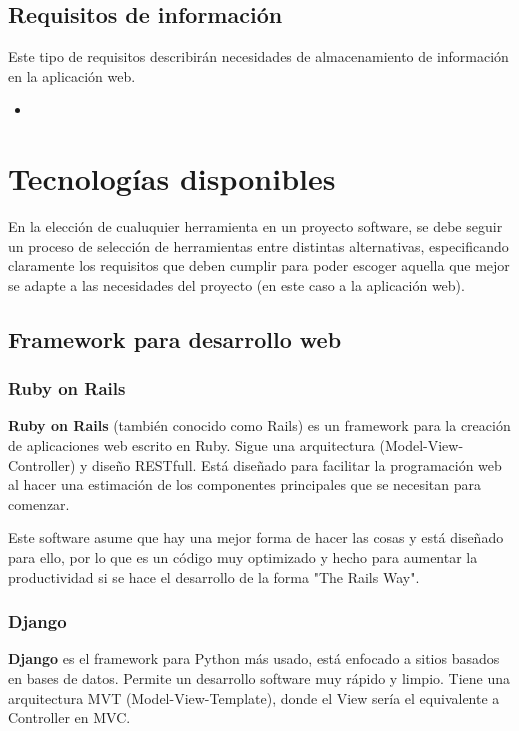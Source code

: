 \subsection{Requisitos de información}
Este tipo de requisitos describirán necesidades de almacenamiento de información en
la aplicación web.

    \begin{itemize}
        \item 
    \end{itemize}

\section{Tecnologías disponibles}
En la elección de cualuquier herramienta en un proyecto software, se debe seguir un
proceso de selección de herramientas entre distintas alternativas, especificando claramente
los requisitos que deben cumplir para poder escoger aquella que mejor se adapte a las
necesidades del proyecto (en este caso a la aplicación web).

\subsection{Framework para desarrollo web}

    \subsubsection{Ruby on Rails}
    \textbf{Ruby on Rails} (también conocido como Rails) es un framework para la creación de
    aplicaciones web escrito en Ruby. Sigue una arquitectura (Model-View-Controller) 
    y diseño RESTfull. Está diseñado para facilitar la programación web al hacer una estimación de los
    componentes principales que se necesitan para comenzar.

    Este software asume que hay una mejor forma de hacer las cosas y está diseñado para
    ello, por lo que es un código muy optimizado y hecho para aumentar la productividad
    si se hace el desarrollo de la forma "The Rails Way".

    \subsubsection{Django}
    \textbf{Django} es el framework para Python más usado, está enfocado a sitios basados
    en bases de datos. Permite un desarrollo software muy rápido y limpio. Tiene una
    arquitectura MVT (Model-View-Template), donde el View sería el equivalente a Controller
    en MVC.


